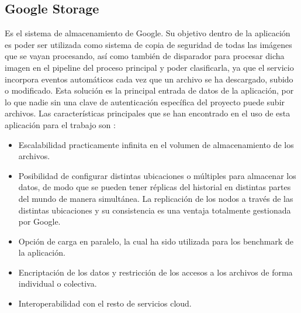 \subsection{Google Storage}\label{subsec:storage}
Es el sistema de almacenamiento de Google.
Su objetivo dentro de la aplicación es poder ser utilizada como sistema de copia de seguridad de todas las imágenes que se vayan procesando, así como también de disparador para procesar dicha
imagen en el pipeline del proceso principal y poder clasificarla, ya que el servicio incorpora eventos automáticos cada vez que un archivo se ha descargado, subido o modificado.
Esta solución es la principal entrada de datos de la aplicación, por lo que nadie sin una clave de autenticación específica del proyecto puede subir archivos.
Las características principales que se han encontrado en el uso de esta aplicación para el trabajo son :
\begin{itemize}
    \item Escalabilidad practicamente infinita en el volumen de almacenamiento de los archivos.
    \item Posibilidad de configurar distintas ubicaciones o múltiples para almacenar los datos, de modo que se pueden tener réplicas del historial en distintas partes del mundo de manera simultánea.
    La replicación de los nodos a través de las distintas ubicaciones y su consistencia es una ventaja totalmente gestionada por Google.
    \item Opción de carga en paralelo, la cual ha sido utilizada para los benchmark de la aplicación.
    \item Encriptación de los datos y restricción de los accesos a los archivos de forma individual o colectiva.
    \item Interoperabilidad con el resto de servicios cloud.
\end{itemize}

